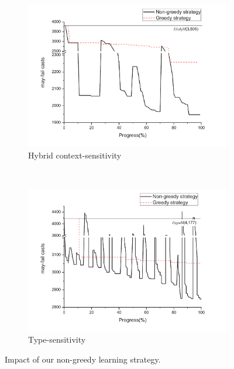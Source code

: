 \begin{figure}[t]
  \centering
  \begin{subfigure}[b]{.48\textwidth}
  \includegraphics[width=\textwidth]{ContextTunneling/figures/sobj_ours_greedy.pdf}
  \caption{Hybrid context-sensitivity}
  \label{fig:greedy_sobj}
  \end{subfigure}
  ~
  \begin{subfigure}[b]{.48\textwidth}
  \includegraphics[width=\textwidth]{ContextTunneling/figures/type_ours_greedy.pdf}
  \caption{Type-sensitivity}
  \label{fig:greedy_type}
  \end{subfigure}
  \caption{Impact of our non-greedy learning strategy.
}
  \label{fig:greedy}
\end{figure}


